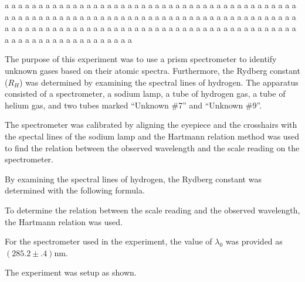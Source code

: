 \begin{paper}

a a a a a a a a a a a a a a a a a a a a a a a a a a a a a a a a a a a a a a a a a a a a a a a a a a a a a a a a a a a a a a a a a a a a a a a a a a a a a a a a a a a a a a a a a a a a a a a a a a a a a a a a a a a a a a a a a a a a a a a a a a a a a a a a a a a a a a a a a a a a a a a a a a a a

The purpose of this experiment was to use a prism spectrometer to identify
unknown gases based on their atomic spectra.
Furthermore, the Rydberg constant ($R_H$) was determined by examining the
spectral lines of hydrogen.
The apparatus consisted of a spectrometer, a sodium lamp, a tube of hydrogen
gas, a tube of helium gas, and two tubes marked ``Unknown
\#7'' and ``Unknown \#9''.

The spectrometer was calibrated by aligning the eyepiece and the crosshairs with the spectal lines of the sodium lamp and the Hartmann relation method was used to find the
relation between the observed wavelength and the scale reading on the
spectrometer.

By examining the spectral lines of hydrogen, the Rydberg constant was
determined with the following formula.

\begin{paperwhere}
\end{paperwhere}

To determine the relation between the scale reading and the
observed wavelength, the Hartmann relation was used.\columnbreak

\begin{paperwhere}
\end{paperwhere}

For the spectrometer used in the experiment, the value of $\lambda_0$ was
provided as $(285.2\pm.4)\si{\nano\meter}$.

The experiment was setup as shown.


\end{paper}
